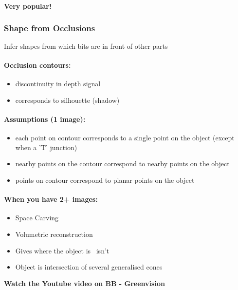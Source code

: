 \documentclass[paper=a4, fontsize=11pt]{article} %
\numberwithin{equation}{section} %
\numberwithin{figure}{section} %
\numberwithin{table}{section} %
\begin{document}
\textbf{Very popular!}

\subsubsection{Shape from Occlusions}
Infer shapes from which bits are in front of other parts

\paragraph{Occlusion contours:}
\begin{itemize}
\item discontinuity in depth signal
\item corresponds to silhouette (shadow)
\end{itemize}

\paragraph{Assumptions (1 image):}
\begin{itemize}
\item each point on contour corresponds to a single point on the object (except when a 'T' junction)
\item nearby points on the contour correspond to nearby points on the object
\item points on contour correspond to planar points on the object
\end{itemize}

\paragraph{When you have 2+ images:}
\begin{itemize}
\item Space Carving
\item Volumetric reconstruction
\item Gives where the object is \ isn't
\item Object is intersection of several generalised cones
\end{itemize}

\textbf{Watch the Youtube video on BB - Greenvision}
\end{document}
